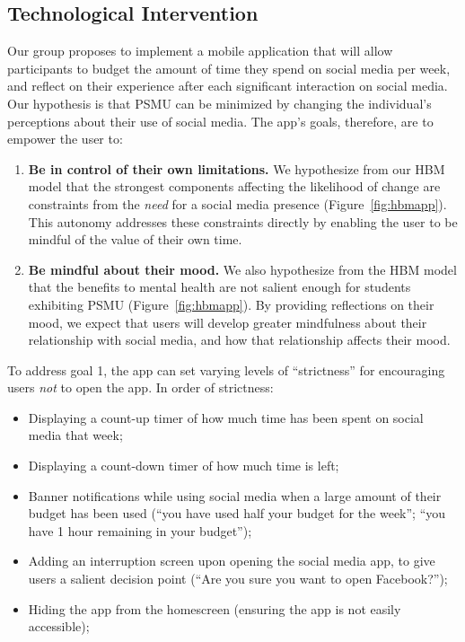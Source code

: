 \documentclass[
  man]{apa6}
\begin{document}
\hypertarget{technological-intervention}{%
\subsection{Technological Intervention}\label{technological-intervention}}

Our group proposes to implement a mobile application that will allow participants
to budget the amount of time they spend on social media per week, and reflect on
their experience after each significant interaction on social media. Our hypothesis is
that PSMU can be minimized by changing the individual's perceptions about their
use of social media. The app's goals, therefore, are to empower the user to:

\begin{enumerate}
\def\labelenumi{\arabic{enumi}.}
\item
  \textbf{Be in control of their own limitations.} We hypothesize from our HBM model
  that the strongest components affecting the likelihood of change are
  constraints from the \emph{need} for a social media presence
  (Figure~\ref{fig:hbmapp}). This autonomy addresses these constraints directly
  by enabling the user to be mindful of the value of their own time.
\item
  \textbf{Be mindful about their mood.} We also hypothesize from the HBM model
  that the benefits to mental health are not salient enough for students exhibiting
  PSMU (Figure~\ref{fig:hbmapp}). By providing reflections on their mood, we
  expect that users will develop greater mindfulness about their relationship with
  social media, and how that relationship affects their mood.
\end{enumerate}

To address goal 1, the app can set varying levels of ``strictness'' for encouraging
users \emph{not} to open the app. In order of strictness:

\begin{itemize}
\item
  Displaying a count-up timer of how much time has been spent on social media that week;
\item
  Displaying a count-down timer of how much time is left;
\item
  Banner notifications while using social media when a large amount of their
  budget has been used (``you have used half your budget for the week''; ``you have 1 hour remaining in your budget'');
\item
  Adding an interruption screen upon opening the social media app, to give users
  a salient decision point (``Are you sure you want to open Facebook?'');
\item
  Hiding the app from the homescreen (ensuring the app is not easily accessible);
\end{itemize}
\end{document}
